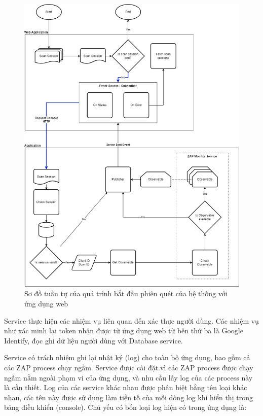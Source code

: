 \begin{figure}[H]
      \centering
      \includegraphics[width=\textwidth]{applied-thesis-chapters/chapter-3/Sơ đồ tuần tự của quá trình bắt đầu phiên quét của hệ thống với ứng dụng web.png}
      \caption{Sơ đồ tuần tự của quá trình bắt đầu phiên quét của hệ thống với ứng dụng web}
      \label{fig:TTHeThongStartScan}
\end{figure}

\tab \tab Service thực hiện các nhiệm vụ liên quan đến xác thực người dùng.
Các nhiệm vụ như xác minh lại token nhận được từ ứng dụng web từ bên thứ ba là Google Identify, đọc ghi dữ liệu người dùng với Database service.

\tab \tab Service có trách nhiệm ghi lại nhật ký (log) cho toàn bộ ứng dụng, bao gồm cả các ZAP process chạy ngầm.
Service được cài đặt.vì các ZAP process được chạy ngầm nằm ngoài phạm vi của ứng dụng, và nhu cầu lấy log của các process này là cần thiết.
Log của các service khác nhau được phân biệt bằng tên loại khác nhau, các tên này được sử dụng làm tiền tố của mỗi dòng log khi hiển thị trong bảng điều khiển (console).
Chủ yếu có bốn loại log hiện có trong ứng dụng là:

